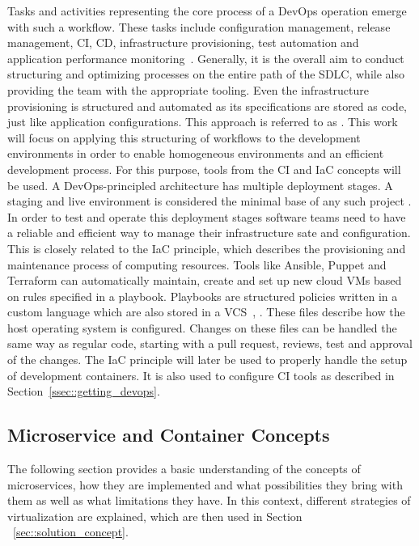         \noindent Tasks and activities representing the core process of a DevOps operation emerge with such a workflow. These tasks include configuration management, release management, \ac{CI}, \ac{CD}, infrastructure provisioning, test automation and application performance monitoring~\cite{azuredevops}.
        Generally, it is the overall aim to conduct structuring and optimizing processes on the entire path of the \ac{SDLC}, while also providing the team with the appropriate tooling. Even the infrastructure provisioning is structured and automated as its specifications are stored as code, just like application configurations. This approach is referred to as  \cite{base_devops}. This work will focus on applying this structuring of workflows to the development environments in order to enable homogeneous environments and an efficient development process. For this purpose, tools from the \ac{CI} and \ac{IaC} concepts will be used. \newline
        A DevOps-principled architecture has multiple deployment stages. A staging and live environment is considered the minimal base of any such project \cite{azuredevops}. In order to test and operate this deployment stages software teams need to have a reliable and efficient way to manage their infrastructure sate and configuration. This is closely related to the \ac{IaC} principle, which describes the provisioning and maintenance process of computing resources. Tools like Ansible, Puppet and Terraform can automatically maintain, create and set up new cloud \ac{VM}s based on rules specified in a playbook. Playbooks are structured policies written in a custom language which are also stored in a \ac{VCS}~\cite{ansible2020}, \cite{azuredevops}. These files describe how the host operating system is configured. Changes on these files can be handled the same way as regular code, starting with a pull request, reviews, test and approval of the changes. The \acl{IaC} principle will later be used to properly handle the setup of development containers. It is also used to configure \acs{CI} tools as described in Section~\ref{ssec::getting_devops}.

    \subsection{Microservice and Container Concepts}\label{ssec::microservices}
    The following section provides a basic understanding of the concepts of microservices, how they are implemented and what possibilities they bring with them as well as what limitations they have. In this context, different strategies of virtualization are explained, which are then used in Section ~\ref{sec::solution_concept}.

